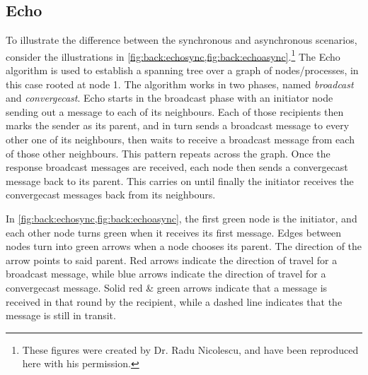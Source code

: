 \subsection{Echo}
To illustrate the difference between the synchronous and asynchronous scenarios, consider the illustrations in \cref{fig:back:echosync,fig:back:echoasync}.\footnote{These figures were created by Dr. Radu Nicolescu, and have been reproduced here with his permission.}  The Echo algorithm \cite[Ch.~4.3]{Fokkink2013} is used to establish a spanning tree over a graph of nodes/processes, in this case rooted at node 1.  The algorithm works in two phases, named \emph{broadcast} and \emph{convergecast}.  Echo starts in the broadcast phase with an initiator node sending out a message to each of its neighbours.  Each of those recipients then marks the sender as its parent, and in turn sends a broadcast message to every other one of its neighbours, then waits to receive a broadcast message from each of those other neighbours.  This pattern repeats across the graph.  Once the response broadcast messages are received, each node then sends a convergecast message back to its parent.  This carries on until finally the initiator receives the convergecast messages back from its neighbours.

In \cref{fig:back:echosync,fig:back:echoasync}, the first green node is the initiator, and each other node turns green when it receives its first message.  Edges between nodes turn into green arrows when a node chooses its parent.  The direction of the arrow points to said parent.  Red arrows indicate the direction of travel for a broadcast message, while blue arrows indicate the direction of travel for a convergecast message.  Solid red \& green arrows indicate that a message is received in that round by the recipient, while a dashed line indicates that the message is still in transit.

